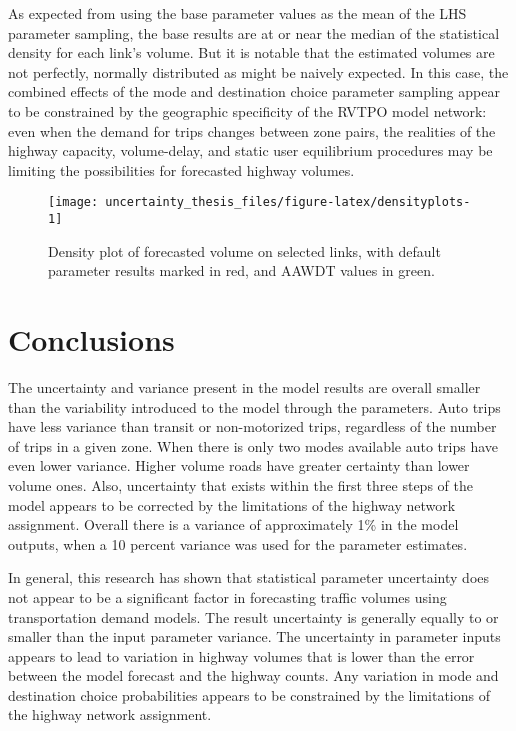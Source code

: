 \documentclass[fancy, masters]{byuthesis}
\begin{document}
As expected from using the base parameter values as the mean of the LHS parameter sampling, the base results are at or near the median of the statistical density for each link's volume. But it is notable that the estimated volumes are not perfectly, normally distributed as might be naively expected. In this case, the combined effects of the mode and destination choice parameter sampling appear to be constrained by the geographic specificity of the RVTPO model network: even when the demand for trips changes between zone pairs, the realities of the highway capacity, volume-delay, and static user equilibrium procedures may be limiting the possibilities for forecasted highway volumes.

\begin{sidewaysfigure}

{\centering \texttt{[image: uncertainty\_thesis\_files/figure-latex/densityplots-1]} 

}

\caption{Density plot of forecasted volume on selected links, with default parameter results marked in red, and AAWDT values in green.}\label{fig:densityplots}
\end{sidewaysfigure}

\hypertarget{conclusions}{%
\chapter{Conclusions}\label{conclusions}}

The uncertainty and variance present in the model results are overall smaller than the variability introduced to the model through the parameters. Auto trips have less variance than transit or non-motorized trips, regardless of the number of trips in a given zone. When there is only two modes available auto trips have even lower variance. Higher volume roads have greater certainty than lower volume ones. Also, uncertainty that exists within the first three steps of the model appears to be corrected by the limitations of the highway network assignment. Overall there is a variance of approximately 1\% in the model outputs, when a 10 percent variance was used for the parameter estimates.

In general, this research has shown that statistical parameter uncertainty does not appear to be a significant factor in forecasting traffic volumes using transportation demand models. The result uncertainty is generally equally to or smaller than the input parameter variance. The uncertainty in parameter inputs appears to lead to variation in highway volumes that is lower than the error between the model forecast and the highway counts. Any variation in mode and destination choice probabilities appears to be constrained by the limitations of the highway network assignment.
\end{document}
